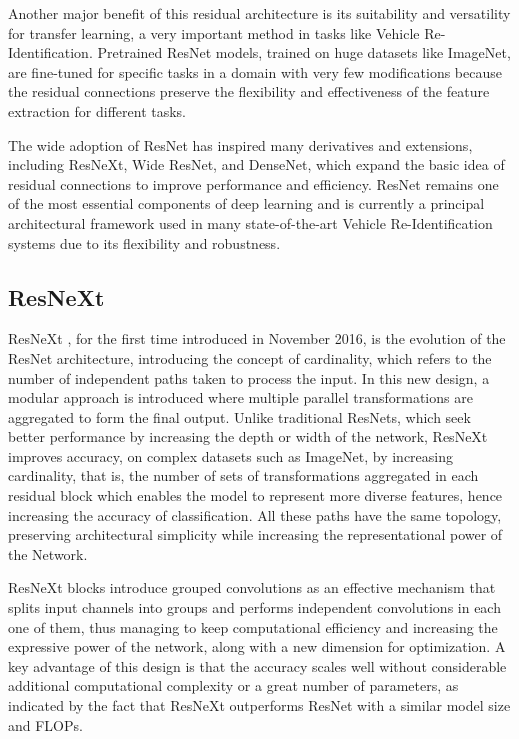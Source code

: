 Another major benefit of this residual architecture is its suitability and versatility for transfer learning, a very important method in tasks like Vehicle Re-Identification. Pretrained ResNet models, trained on huge datasets like ImageNet, are fine-tuned for specific tasks in a domain with very few modifications because the residual connections preserve the flexibility and effectiveness of the feature extraction for different tasks.

The wide adoption of ResNet has inspired many derivatives and extensions, including ResNeXt, Wide ResNet, and DenseNet, which expand the basic idea of residual connections to improve performance and efficiency. ResNet remains one of the most essential components of deep learning and is currently a principal architectural framework used in many state-of-the-art Vehicle Re-Identification systems due to its flexibility and robustness.

\subsection{ResNeXt}
ResNeXt \cite{ResNeXt}, for the first time introduced in November 2016, is the evolution of the ResNet architecture, introducing the concept of cardinality, which refers to the number of independent paths taken to process the input. In this new design, a modular approach is introduced where multiple parallel transformations are aggregated to form the final output. Unlike traditional ResNets, which seek better performance by increasing the depth or width of the network, ResNeXt improves accuracy, on complex datasets such as ImageNet, by increasing cardinality, that is, the number of sets of transformations aggregated in each residual block which enables the model to represent more diverse features, hence increasing the accuracy of classification. All these paths have the same topology, preserving architectural simplicity while increasing the representational power of the Network.

ResNeXt blocks introduce grouped convolutions as an effective mechanism that splits input channels into groups and performs independent convolutions in each one of them, thus managing to keep computational efficiency and increasing the expressive power of the network, along with a new dimension for optimization. A key advantage of this design is that the accuracy scales well without considerable additional computational complexity or a great number of parameters, as indicated by the fact that ResNeXt outperforms ResNet with a similar model size and FLOPs.

